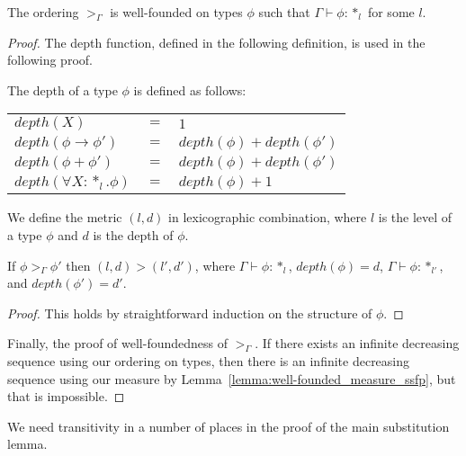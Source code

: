 \begin{thm}
  The ordering $>_\Gamma$ is well-founded on types $\phi$ such that 
  $\Gamma \vdash \phi:*_l$ for some $l$.
  \label{thm:well-founded_ordering_ssfp}
\end{thm}
\begin{proof}
  The depth function, defined in the following definition, is used in the following proof.

  \begin{definition}
    The depth of a type $\phi$ is defined as follows:
    \begin{center}
      \begin{tabular}{lll}
        $depth(X)$                  & $=$ & $1$\\
        $depth(\phi \to \phi')$     & $=$ & $depth(\phi) + depth(\phi')$\\
        $depth(\phi + \phi')$       & $=$ & $depth(\phi) + depth(\phi')$\\
        $depth(\forall X:*_l.\phi)$ & $=$ & $depth(\phi) + 1$\\
      \end{tabular}
    \end{center}
  \end{definition}

  We define the metric $(l,d)$ in lexicographic combination, where $l$
  is the level of a type $\phi$ and $d$ is the depth of $\phi$.

  \begin{lemma}
    \label{lemma:well-founded_measure_ssfp}
    If $\phi >_\Gamma \phi'$ then $(l,d) > (l',d')$, where $\Gamma \vdash \phi:*_l$, 
    $depth(\phi) = d$,  $\Gamma \vdash \phi:*_{l'}$, and $depth(\phi') = d'$.
  \end{lemma}
  \begin{proof}
    This holds by straightforward induction on the structure of
    $\phi$. 
  \end{proof}
  
  Finally, the proof of well-foundedness of $>_\Gamma$.  If there exists
  an infinite decreasing sequence using our ordering on types, then there
  is an infinite decreasing sequence using our measure by
  Lemma~\ref{lemma:well-founded_measure_ssfp}, but that is impossible.
\end{proof}
\noindent
We need transitivity in a number of places in the proof of the main
substitution lemma.  

